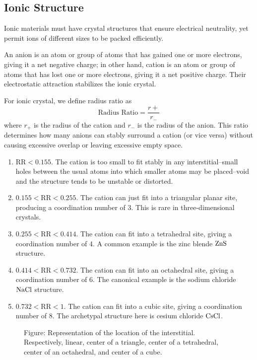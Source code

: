 \documentclass[../../../main.tex]{subfiles}
\begin{document}
\subsection{Ionic Structure}
Ionic materials must have crystal structures that ensure electrical neutrality, yet permit ions of different sizes to be packed efficiently.

An anion is an atom or group of atoms that has gained one or more electrons, giving it a net negative charge; in other hand, cation is an atom or group of atoms that has lost one or more electrons, giving it a net positive charge.
Their electrostatic attraction stabilizes the ionic crystal.

For ionic crystal, we define radius ratio as
\begin{equation*}
    \text{Radius Ratio}=\frac{r+ }{r_-}
\end{equation*}
where $r_+$ is the radius of the cation and $r_-$ is the radius of the anion.
This ratio determines how many anions can stably surround a cation (or vice versa) without causing excessive overlap or leaving excessive empty space.
\begin{enumerate}
    \item $\text{RR}<0.155$. The cation is too small to fit stably in any interstitial--small holes between the usual atoms into which smaller atoms may be placed--void and the structure tends to be unstable or distorted.
    \item $0.155<\text{RR}<0.255$. The cation can just fit into a triangular planar site, producing a coordination number of 3. This is rare in three-dimensional crystals.
    \item $0.255<\text{RR}<0.414$. The cation can fit into a tetrahedral site, giving a coordination number of 4. A common example is the zinc blende $\ce{ZnS}$ structure.
    \item $0.414<\text{RR}<0.732$. The cation can fit into an octahedral site, giving a coordination number of 6. The canonical example is the sodium chloride $\ce{NaCl}$ structure.
    \item $0.732<\text{RR}<1$. The cation can fit into a cubic site, giving a coordination number of 8. The archetypal structure here is cesium chloride $\ce{CsCl}$.
\end{enumerate}
\begin{figure}[]
    \centering
    \caption*{Figure: Representation of the location of the interstitial. Respectively, linear, center of a triangle, center of a tetrahedral, center of an octahedral, and center of a cube.}
\end{figure}
\end{document}
